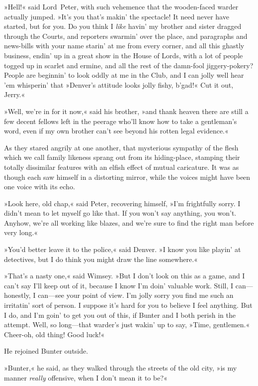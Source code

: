 »Hell!« said Lord~Peter, with such vehemence that the wooden-faced warder actually jumped. »It's you that's makin' the spectacle! It need never have started, but for you. Do you think I \textit{like} havin' my brother and sister dragged through the Courts, and reporters swarmin' over the place, and paragraphs and news-bills with your name starin' at me from every corner, and all this ghastly business, endin' up in a great show in the House of Lords, with a lot of people togged up in scarlet and ermine, and all the rest of the damn-fool jiggery-pokery? People are beginnin' to look oddly at me in the Club, and I can jolly well hear 'em whisperin' that »Denver's attitude looks jolly fishy, b'gad!« Cut it out, Jerry.«

»Well, we're in for it now,« said his brother, »and thank heaven there are still a few decent fellows left in the peerage who'll know how to take a gentleman's word, even if my own brother can't see beyond his rotten legal evidence.«

As they stared angrily at one another, that mysterious sympathy of the flesh which we call family likeness sprang out from its hiding-place, stamping their totally dissimilar features with an elfish effect of mutual caricature. It was as though each saw himself in a distorting mirror, while the voices might have been one voice with its echo.

»Look here, old chap,« said Peter, recovering himself, »I'm frightfully sorry. I didn't mean to let myself go like that. If you won't say anything, you won't. Anyhow, we're all working like blazes, and we're sure to find the right man before very long.«

»You'd better leave it to the police,« said Denver. »I know you like playin' at detectives, but I do think you might draw the line somewhere.«

»That's a nasty one,« said Wimsey. »But I don't look on this as a game, and I can't say I'll keep out of it, because I know I'm doin' valuable work. Still, I can—honestly, I can—see your point of view. I'm jolly sorry you find me such an irritatin' sort of person. I suppose it's hard for you to believe I feel anything. But I do, and I'm goin' to get you out of this, if Bunter and I both perish in the attempt. Well, so long—that warder's just wakin' up to say, »Time, gentlemen.« Cheer-oh, old thing! Good luck!«

He rejoined Bunter outside.

»Bunter,« he said, as they walked through the streets of the old city, »is my manner \textit{really} offensive, when I don't mean it to be?«

